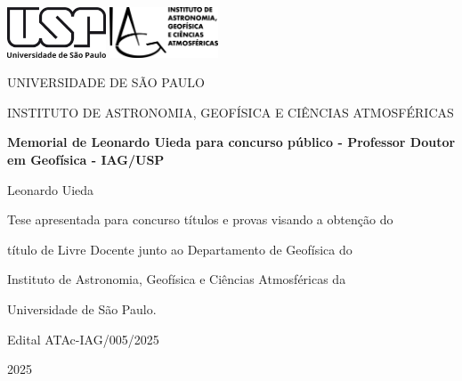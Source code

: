 \documentclass[10pt,a4paper,oneside]{book}
\newcommand{\ThesisYear}{2025}
\newcommand{\ThesisAuthor}{Leonardo Uieda}
\newcommand{\ThesisTitle}{Memorial de \ThesisAuthor{} para concurso público - Professor Doutor em Geofísica - IAG/USP}
\begin{document}
\pagestyle{plain}
\frontmatter

\begin{titlepage}
  \begin{center}
    \includegraphics[height=1.5cm]{images/usp.png}
    \hspace{1cm}
    \includegraphics[height=1.5cm]{images/iag.png}
    \vspace{1cm}

    UNIVERSIDADE DE SÃO PAULO

    INSTITUTO DE ASTRONOMIA, GEOFÍSICA E CIÊNCIAS ATMOSFÉRICAS
    \vspace{5cm}

    \textbf{\huge \ThesisTitle}
    \vspace{2cm}

    {\Large \ThesisAuthor}
    \vspace{5cm}

    {\small
      Tese apresentada para concurso títulos e provas visando a obtenção do

      título de Livre Docente junto ao Departamento de Geofísica do

      Instituto de Astronomia, Geofísica e Ciências Atmosféricas da

      Universidade de São Paulo.
      \vspace{1cm}

      Edital ATAc-IAG/005/2025
    }
    \vfill

    \ThesisYear{}
  \end{center}
\end{titlepage}


\end{document}
